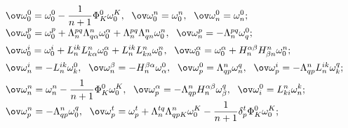 \begin{equation}


\begin{array}{l}


\dd \ov \omega^0_0=\omega^0_0-\frac 1{n+1} \Phi^0_K \omega^K_0,\ \;


\ov \omega^n_0=\omega^n_0,\ \;


\ov \omega^0_n=\omega^0_n; \\[2mm]


%


\ov \omega^p_0=\omega^p_0+


\Lambda^{pq}_n \Lambda^n_{q\alpha}\omega^\alpha_0+


\Lambda^{pq}_n \Lambda^n_{qn}\omega^n_0,\ \;


\ov \omega^p_n=-\Lambda^{pq}_n \omega^0_q; \\[2mm]


%


\ov \omega^i_0=\omega^i_0+


L^{ik}_n L^n_{k\alpha}\omega^\alpha_0+


L^{ik}_n L^n_{kn}\omega^n_0,\ \;


\ov \omega^\alpha_0=\omega^\alpha_0


+H^{\alpha \beta}_n H^n_{\beta n}\omega^n_0; \\[2mm]


%


\ov \omega^i_n=-L^{ik}_n \omega^0_k,\ \;


\ov \omega^\beta_n=-H^{\beta \alpha}_n \omega^0_\alpha,\ \;


\ov \omega^0_p=\Lambda^n_{qp} \omega^q_n,\ \;


\ov \omega^i_p=-\Lambda^n_{qp} L^{ik}_n \omega^q_k; \\[2mm]


%


\dd \ov \omega^n_n=\omega^n_n-\frac 1{n+1} \Phi^0_K \omega^K_0,\ \;


\ov \omega^\alpha_p=-\Lambda^n_{qp} H^{\alpha \beta}_n \omega^q_\beta,\ \;


\ov \omega^0_i=L^n_{ki} \omega^k_n; \\[2mm]


%


\dd \ov \omega^n_p=-\Lambda^n_{qp} \omega^q_0,\ \;


\ov \omega^t_p=\omega^t_p+


\Lambda^{tq}_n \Lambda^n_{qpK}\omega^K_0-


\frac 1{n+1} \delta^t_p \Phi^0_K \omega^K_0; \\[2mm]



\end{array}
\end{equation}
